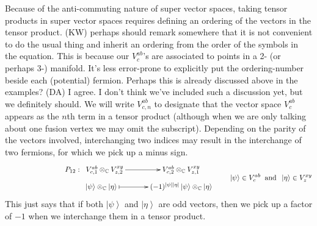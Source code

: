 \documentclass[12pt,a4paper]{article}
\newcounter{arrow}
\newcommand{\tp}{\otimes}
\newcommand{\ket}[1]{\ensuremath{\left|#1\right\rangle}}
\newcommand{\dave}[1]{{\color{ao(english)}\footnotesize{(DA) #1}}}
\newcommand{\kw}[1]{{\color{kwcolor}\footnotesize{(KW) #1}}}
\begin{document}
Because of the anti-commuting nature of super vector spaces, taking tensor products in super vector spaces requires defining an ordering of the vectors in the tensor product.
\kw{perhaps should remark somewhere that it is not convenient to do the usual thing
and inherit an ordering from the order of the symbols in the equation.
This is because our $V^{ab}_c$'s are associated to points in a 2- (or perhaps 3-) manifold.
It's less error-prone to explicitly put the ordering-number beside each (potential) fermion.
Perhaps this is already discussed above in the examples?}
\dave{I agree. I don't think we've included such a discussion yet, but we definitely should.}
We will write $V^{ab}_{c,n}$ to designate that the vector space $V^{ab}_c$ appears as the $n$th term in a tensor product (although when we are only talking about one fusion vertex we may omit the subscript).
Depending on the parity of the vectors involved, interchanging two indices may result in the interchange of two fermions, for which we pick up a minus sign. 
\begin{align}
\vcenter{\xymatrix @!0 @M=1mm @C=42mm{
 &P_{12}: \; \;V^{ab}_{c,1} \tp_{\mathbb{C}} V^{xy}_{z,2} \ar[r]            & V^{ab}_{c,2} \tp_{\mathbb{C}} V^{xy}_{z,1} \\
		  &\;\;\;\;\;\;\; \ket{\psi}\tp_\mathbb{C} \ket{\eta}  \ar@{|->}[r] & (-1)^{|\psi| |\eta|} \ket{\psi} \tp_{\mathbb{C}} \ket{\eta}
	}} \quad \quad \ket{\psi} \in V^{ab}_{c} \;\; \text{and} \;\;  \ket{\eta} \in V^{xy}_{z}
\end{align}
This just says that if both $\ket{\psi}$ and $\ket{\eta}$ are odd vectors, then we pick up a factor of $-1$ when we interchange them in a tensor product. 
\end{document}
